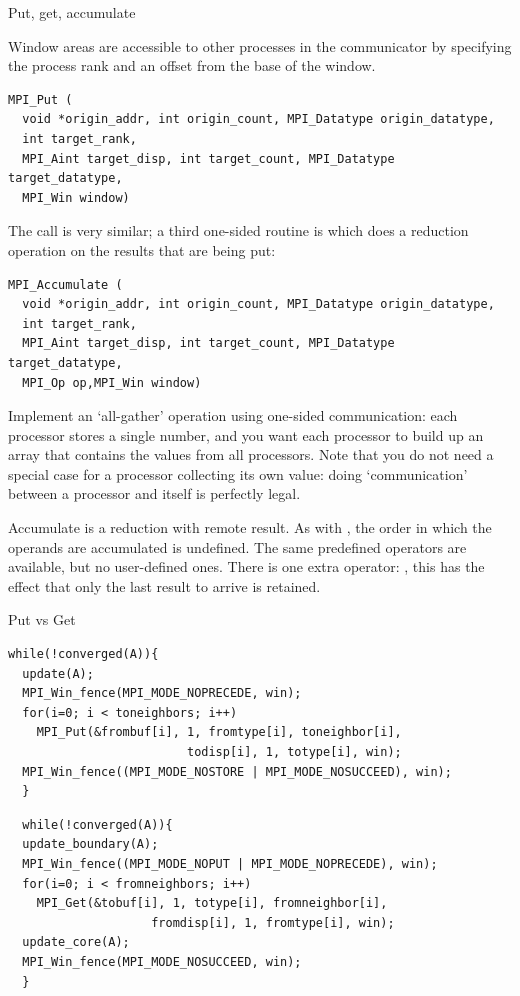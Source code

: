 
 {Put, get, accumulate}

Window areas are 
accessible to other processes in the communicator by specifying the
process rank and an offset from the base of the window.
\begin{verbatim}
MPI_Put (
  void *origin_addr, int origin_count, MPI_Datatype origin_datatype,
  int target_rank,
  MPI_Aint target_disp, int target_count, MPI_Datatype target_datatype,
  MPI_Win window)
\end{verbatim}
The  call is very similar; a third one-sided routine
is  which does a reduction operation on the results
that are being put:
\begin{verbatim}
MPI_Accumulate (
  void *origin_addr, int origin_count, MPI_Datatype origin_datatype, 
  int target_rank,
  MPI_Aint target_disp, int target_count, MPI_Datatype target_datatype,
  MPI_Op op,MPI_Win window)
\end{verbatim}

\begin{exercise}
  Implement an `all-gather' operation using one-sided communication:
  each processor stores a single number, and you want each processor
  to build up an array that contains the values from all
  processors. Note that you do not need a special case for a processor
  collecting its own value: doing `communication' between a processor
  and itself is perfectly legal.
\end{exercise}

Accumulate is a reduction with remote result. As with , the 
order in which the operands are accumulated is undefined. 
The same predefined operators are available, but no
user-defined ones. There is one extra operator: ,
this has the effect that only the last result to arrive is retained.

 {Put vs Get}

\begin{verbatim}
while(!converged(A)){ 
  update(A); 
  MPI_Win_fence(MPI_MODE_NOPRECEDE, win); 
  for(i=0; i < toneighbors; i++) 
    MPI_Put(&frombuf[i], 1, fromtype[i], toneighbor[i], 
                         todisp[i], 1, totype[i], win); 
  MPI_Win_fence((MPI_MODE_NOSTORE | MPI_MODE_NOSUCCEED), win); 
  } 
\end{verbatim}
\begin{verbatim}
  while(!converged(A)){ 
  update_boundary(A); 
  MPI_Win_fence((MPI_MODE_NOPUT | MPI_MODE_NOPRECEDE), win); 
  for(i=0; i < fromneighbors; i++) 
    MPI_Get(&tobuf[i], 1, totype[i], fromneighbor[i], 
                    fromdisp[i], 1, fromtype[i], win); 
  update_core(A); 
  MPI_Win_fence(MPI_MODE_NOSUCCEED, win); 
  } 
\end{verbatim}

